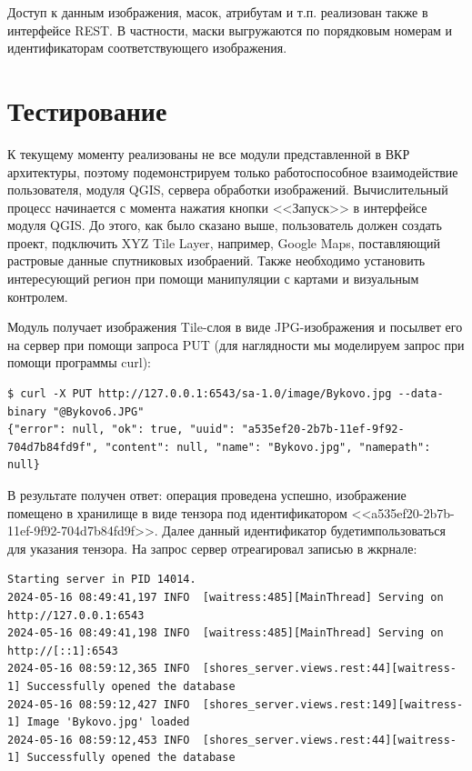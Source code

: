\documentclass[732,fontsize=14pt,final]{studrep}
\begin{document}
Доступ к данным изображения, масок, атрибутам и т.п. реализован также в интерфейсе REST. В частности, маски выгружаются по порядковым номерам и идентификаторам соответствующего изображения.

\section{Тестирование}

К текущему моменту реализованы не все модули представленной в ВКР архитектуры, поэтому подемонстрируем только работоспособное взаимодействие пользователя, модуля QGIS, сервера обработки изображений. Вычислительный процесс начинается с момента нажатия кнопки <<Запуск>> в интерфейсе модуля QGIS. До этого, как было сказано выше, пользователь должен создать проект, подключить XYZ Tile Layer, например, Google Maps, поставляющий растровые данные спутниковых изобраений. Также необходимо установить интересующий регион при помощи манипуляции с картами и визуальным контролем.

Модуль получает изображения Tile-слоя в виде JPG-изображения и посылвет его на сервер при помощи запроса PUT (для наглядности мы моделируем запрос при помощи программы curl):
\begin{verbatim}
$ curl -X PUT http://127.0.0.1:6543/sa-1.0/image/Bykovo.jpg --data-binary "@Bykovo6.JPG"
{"error": null, "ok": true, "uuid": "a535ef20-2b7b-11ef-9f92-704d7b84fd9f", "content": null, "name": "Bykovo.jpg", "namepath": null}
\end{verbatim}

В результате получен ответ: операция проведена успешно, изображение помещено в хранилище в виде тензора под идентификатором <<a535ef20-2b7b-11ef-9f92-704d7b84fd9f>>. Далее данный идентификатор будетимпользоваться для указания тензора. На запрос сервер отреагировал записью в жкрнале:

\begin{verbatim}
Starting server in PID 14014.
2024-05-16 08:49:41,197 INFO  [waitress:485][MainThread] Serving on http://127.0.0.1:6543
2024-05-16 08:49:41,198 INFO  [waitress:485][MainThread] Serving on http://[::1]:6543
2024-05-16 08:59:12,365 INFO  [shores_server.views.rest:44][waitress-1] Successfully opened the database
2024-05-16 08:59:12,427 INFO  [shores_server.views.rest:149][waitress-1] Image 'Bykovo.jpg' loaded
2024-05-16 08:59:12,453 INFO  [shores_server.views.rest:44][waitress-1] Successfully opened the database
\end{verbatim}
\end{document}

